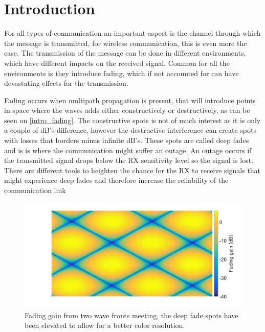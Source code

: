 \chapter{Introduction}

%





For all types of communication an important aspect is the channel through which the message is transmitted, for wireless communication, this is even more the case. The transmission of the message can be done in different environments, which have different impacts on the received signal. Common for all the environments is they introduce fading, which if not accounted for can have devastating effects for the transmission. 

Fading occurs when multipath propagation is present, that will introduce points in space where the waves adds either constructively or destructively, as can be seen on \autoref{intro_fading}. The constructive spots is not of much interest as it is only a couple of dB's difference, however the destructive interference can create spots with losses that borders minus infinite dB's. These spots are called deep fades and is is where the communication might suffer an outage. An outage occurs if the transmitted signal drops below the RX sensitivity level so the signal is lost. There are different tools to heighten the chance for the RX to receive signals that might experience deep fades and therefore increase the reliability of the communication link


\begin{figure}[H]
\centering
\includegraphics[width=\textwidth]{figures/intro_fading.png}
\caption{Fading gain from two wave fronts meeting, the deep fade spots have been elevated to allow for a better color resolution.}
\label{intro_fading}
\end{figure}

